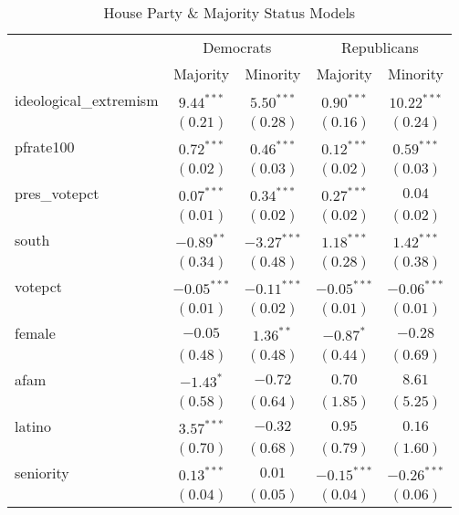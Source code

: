 \documentclass[12pt]{article}
\begin{document}
\begin{table}[H]
	\begin{center}
		\caption{House Party \& Majority Status Models}
		\begin{tabular}{l c c c c }
			\hline
			& \multicolumn{2}{c}{Democrats} & \multicolumn{2}{c}{Republicans} \\
			\cline{2-5}
			& Majority & Minority & Majority & Minority \\
			\hline
			ideological\_extremism & $9.44^{***}$  & $5.50^{***}$  & $0.90^{***}$  & $10.22^{***}$ \\
			& $(0.21)$      & $(0.28)$      & $(0.16)$      & $(0.24)$      \\
			pfrate100              & $0.72^{***}$  & $0.46^{***}$  & $0.12^{***}$  & $0.59^{***}$  \\
			& $(0.02)$      & $(0.03)$      & $(0.02)$      & $(0.03)$      \\
			pres\_votepct          & $0.07^{***}$  & $0.34^{***}$  & $0.27^{***}$  & $0.04$        \\
			& $(0.01)$      & $(0.02)$      & $(0.02)$      & $(0.02)$      \\
			south                  & $-0.89^{**}$  & $-3.27^{***}$ & $1.18^{***}$  & $1.42^{***}$  \\
			& $(0.34)$      & $(0.48)$      & $(0.28)$      & $(0.38)$      \\
			votepct                & $-0.05^{***}$ & $-0.11^{***}$ & $-0.05^{***}$ & $-0.06^{***}$ \\
			& $(0.01)$      & $(0.02)$      & $(0.01)$      & $(0.01)$      \\
			female                 & $-0.05$       & $1.36^{**}$   & $-0.87^{*}$   & $-0.28$       \\
			& $(0.48)$      & $(0.48)$      & $(0.44)$      & $(0.69)$      \\
			afam                   & $-1.43^{*}$   & $-0.72$       & $0.70$        & $8.61$        \\
			& $(0.58)$      & $(0.64)$      & $(1.85)$      & $(5.25)$      \\
			latino                 & $3.57^{***}$  & $-0.32$       & $0.95$        & $0.16$        \\
			& $(0.70)$      & $(0.68)$      & $(0.79)$      & $(1.60)$      \\
			seniority              & $0.13^{***}$  & $0.01$        & $-0.15^{***}$ & $-0.26^{***}$ \\
			& $(0.04)$      & $(0.05)$      & $(0.04)$      & $(0.06)$      \\

\end{tabular}
\end{center}
\end{table}
\end{document}
